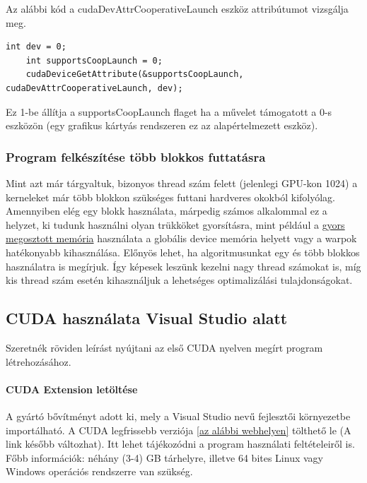 Az alábbi kód a cudaDevAttrCooperativeLaunch eszköz attribútumot vizsgálja meg.
\begin{lstlisting}[style=CStyle]
	int dev = 0;
	int supportsCoopLaunch = 0;
	cudaDeviceGetAttribute(&supportsCoopLaunch, cudaDevAttrCooperativeLaunch, dev);
\end{lstlisting}

Ez 1-be állítja a supportsCoopLaunch flaget ha a művelet támogatott a 0-s eszközön (egy grafikus kártyás rendszeren ez az alapértelmezett eszköz).

\subsubsection{Program felkészítése több blokkos futtatásra}
Mint azt már tárgyaltuk, bizonyos thread szám felett (jelenlegi GPU-kon 1024) a kerneleket már több blokkon szükséges futtani hardveres okokból kifolyólag. Amennyiben elég egy blokk használata, márpedig számos alkalommal ez a helyzet, ki tudunk használni olyan trükköket gyorsításra, mint például a \href{https://docs.nvidia.com/cuda/cuda-c-programming-guide/index.html#shared-memory}{gyors megosztott memória} használata a globális device memória helyett vagy a warpok hatékonyabb kihasználása. Előnyös lehet, ha algoritmusunkat egy és több blokkos használatra is megírjuk. Így képesek leszünk kezelni nagy thread számokat is, míg kis thread szám esetén kihasználjuk a lehetséges optimalizálási tulajdonságokat.



\subsection{CUDA használata Visual Studio alatt}

Szeretnék röviden leírást nyújtani az első CUDA nyelven megírt program létrehozásához.

\paragraph{CUDA Extension letöltése}
A gyártó bővítményt adott ki, mely a Visual Studio nevű fejlesztői környezetbe importálható. A CUDA legfrissebb verziója \href{https://developer.nvidia.com/cuda-downloads}{[az alábbi webhelyen]} tölthető le (A link később változhat). Itt lehet tájékozódni a program használati feltételeiről is. Főbb információk: néhány (3-4) GB tárhelyre, illetve 64 bites Linux vagy Windows operációs rendszerre van szükség.


